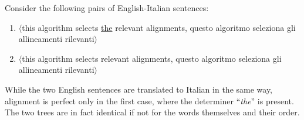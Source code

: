 \begin{example}
    Consider the following pairs of English-Italian sentences:
    \begin{enumerate}
        \item $\langle$this algorithm selects \underline{the} relevant alignments, questo algoritmo seleziona gli allineamenti rilevanti$\rangle$
        \item $\langle$this algorithm selects relevant alignments, questo algoritmo seleziona gli allineamenti rilevanti$\rangle$
    \end{enumerate}

    While the two English sentences are translated to Italian in the same way, alignment is perfect only in the first case, where the determiner ``\textit{the}'' is present. The two trees are in fact identical if not for the words themselves and their order.


\end{example}
